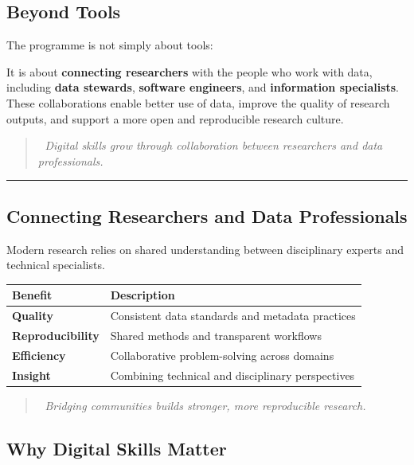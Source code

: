 \documentclass[
  letterpaper,
  DIV=11,
  numbers=noendperiod]{scrartcl}
\begin{document}
\subsection{Beyond Tools}\label{beyond-tools}

The programme is not simply about tools:

It is about \textbf{connecting researchers} with the people who work
with data, including \textbf{data stewards}, \textbf{software
engineers}, and \textbf{information specialists}. These collaborations
enable better use of data, improve the quality of research outputs, and
support a more open and reproducible research culture.

\begin{quote}
🤝 \emph{Digital skills grow through collaboration between researchers
and data professionals.}
\end{quote}

\begin{center}\rule{0.5\linewidth}{0.5pt}\end{center}

\subsection{Connecting Researchers and Data
Professionals}\label{connecting-researchers-and-data-professionals}

Modern research relies on shared understanding between disciplinary
experts and technical specialists.

\begin{longtable}[]{@{}ll@{}}
\toprule\noalign{}
\textbf{Benefit} & \textbf{Description} \\
\midrule\noalign{}
\endhead
\bottomrule\noalign{}
\endlastfoot
\textbf{Quality} & Consistent data standards and metadata practices \\
\textbf{Reproducibility} & Shared methods and transparent workflows \\
\textbf{Efficiency} & Collaborative problem-solving across domains \\
\textbf{Insight} & Combining technical and disciplinary perspectives \\
\end{longtable}

\begin{quote}
💬 \emph{Bridging communities builds stronger, more reproducible
research.}
\end{quote}

\subsection{Why Digital Skills Matter}\label{why-digital-skills-matter}
\end{document}

